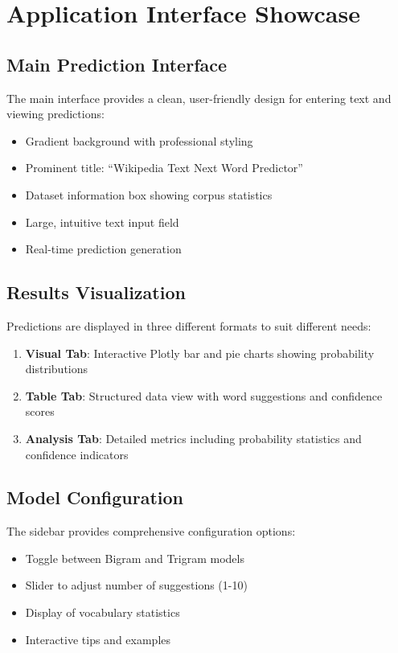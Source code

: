 \documentclass[12pt,a4paper]{report}
\begin{document}
\chapter{Application Interface Showcase}

\section{Main Prediction Interface}

The main interface provides a clean, user-friendly design for entering text and viewing predictions:

\begin{itemize}
    \item Gradient background with professional styling
    \item Prominent title: ``Wikipedia Text Next Word Predictor''
    \item Dataset information box showing corpus statistics
    \item Large, intuitive text input field
    \item Real-time prediction generation
\end{itemize}

\section{Results Visualization}

Predictions are displayed in three different formats to suit different needs:

\begin{enumerate}
    \item \textbf{Visual Tab}: Interactive Plotly bar and pie charts showing probability distributions
    \item \textbf{Table Tab}: Structured data view with word suggestions and confidence scores
    \item \textbf{Analysis Tab}: Detailed metrics including probability statistics and confidence indicators
\end{enumerate}

\section{Model Configuration}

The sidebar provides comprehensive configuration options:

\begin{itemize}
    \item Toggle between Bigram and Trigram models
    \item Slider to adjust number of suggestions (1-10)
    \item Display of vocabulary statistics
    \item Interactive tips and examples
\end{itemize}
\end{document}
